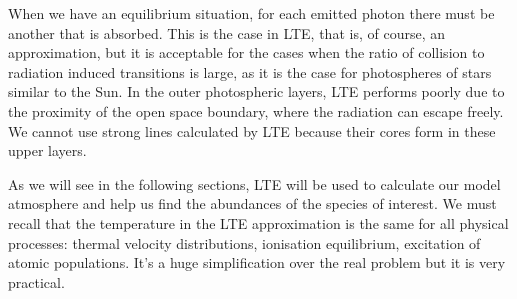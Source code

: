 \documentclass[dvips,12pt,a4paper]{report}
\begin{document}
{When we have an equilibrium situation, for each emitted photon there must be another that is absorbed.%
This is the case in LTE, that is, of course, an approximation, but it is acceptable for the cases when the ratio of collision to radiation induced transitions is large, as it is the case for photospheres of stars similar to the Sun. In the outer photospheric layers, LTE performs poorly due to the proximity of the open space boundary, where the radiation can escape freely. %
We cannot use strong lines calculated by LTE because their cores form in these upper layers.

As we will see in the following sections, LTE will be used to calculate our model atmosphere and help us find the abundances of the species of interest. We must recall that the temperature in the LTE approximation is the same for all physical processes: thermal velocity distributions, ionisation equilibrium, excitation of atomic populations. It's a huge simplification over the real problem but it is very practical.












}
\end{document}
